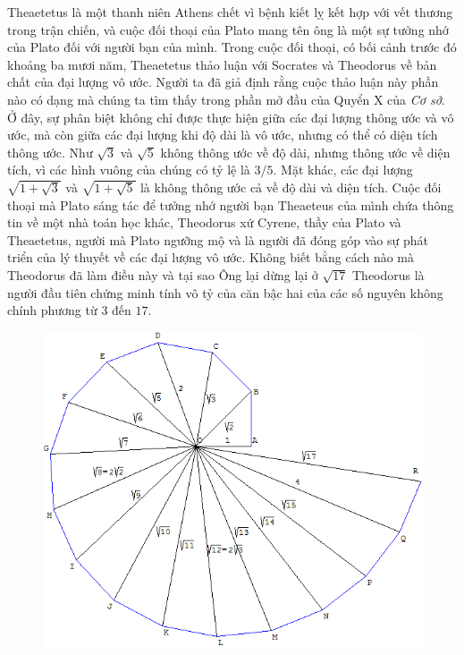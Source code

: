 \begin{multicols}{2}
	\vskip 0.1cm
	Theaetetus là một thanh niên Athens chết vì bệnh kiết lỵ kết hợp với vết thương trong trận chiến, và cuộc đối thoại của Plato mang tên ông là một sự tưởng nhớ của Plato đối với người bạn của mình.
	\vskip 0.1cm
	Trong cuộc đối thoại, có bối cảnh trước đó khoảng ba mươi năm, Theaetetus thảo luận với Socrates và Theodorus về bản chất của đại lượng vô ước. Người ta đã giả định rằng cuộc thảo luận này phần nào có dạng mà chúng ta tìm thấy trong phần mở đầu của Quyển X của \textit{Cơ sở}.
	\vskip 0.1cm
	Ở đây, sự phân biệt không chỉ được thực hiện giữa các đại lượng thông ước và vô ước, mà còn giữa các đại lượng khi độ dài là vô ước, nhưng có thể có diện tích thông ước. Như $\sqrt{3}$  và $\sqrt{5}$  không thông ước về độ dài, nhưng thông ước về diện tích, vì các hình vuông của chúng có tỷ lệ là $3/5$.
	\vskip 0.1cm
	Mặt khác, các đại lượng  $\sqrt{1 + \sqrt{3}}$  và $\sqrt{1 + \sqrt{5}}$ là không thông ước cả về độ dài và diện tích.
	\vskip 0.1cm
	Cuộc đối thoại mà Plato sáng tác để tưởng nhớ người bạn Theaeteus của mình chứa thông tin về một nhà toán học khác, Theodorus xứ Cyrene, thầy của Plato và Theaetetus, người mà Plato ngưỡng mộ và là người đã đóng góp vào sự phát triển của lý thuyết về các đại lượng vô ước. 
	\vskip 0.1cm
	Không biết bằng cách nào mà Theodorus đã làm điều này và tại sao Ông lại dừng lại ở $\sqrt{17}$ 
	\vskip 0.1cm
	Theodorus là người đầu tiên chứng minh tính vô tỷ của căn bậc hai của các số nguyên không chính phương từ $3$ đến $17$.	 
	\begin{figure}[H]
		\vspace*{-5pt}
		\centering
		\captionsetup{labelformat= empty, justification=centering}
		\includegraphics[width= 0.9\linewidth]{H8}

\end{figure}
\end{multicols}
